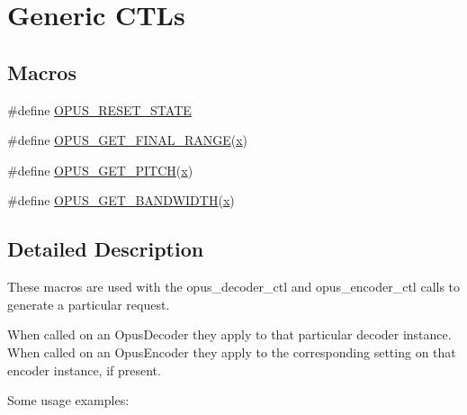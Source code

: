 \hypertarget{group__opus__genericctls}{}\section{Generic C\+T\+Ls}
\label{group__opus__genericctls}
\subsection*{Macros}
\begin{DoxyCompactItemize}
\item 
\#define \mbox{\hyperlink{group__opus__genericctls_gadc74e4fa8bcdf9994187d52d92207337}{O\+P\+U\+S\+\_\+\+R\+E\+S\+E\+T\+\_\+\+S\+T\+A\+TE}}
\item 
\#define \mbox{\hyperlink{group__opus__genericctls_ga1108a508aa475f964d247c1b04d26d89}{O\+P\+U\+S\+\_\+\+G\+E\+T\+\_\+\+F\+I\+N\+A\+L\+\_\+\+R\+A\+N\+GE}}(\mbox{\hyperlink{_s_d_l__opengl_8h_ad0e63d0edcdbd3d79554076bf309fd47}{x}})
\item 
\#define \mbox{\hyperlink{group__opus__genericctls_gaa89fc25eb35fc31a02b508562dd83820}{O\+P\+U\+S\+\_\+\+G\+E\+T\+\_\+\+P\+I\+T\+CH}}(\mbox{\hyperlink{_s_d_l__opengl_8h_ad0e63d0edcdbd3d79554076bf309fd47}{x}})
\item 
\#define \mbox{\hyperlink{group__opus__genericctls_ga29db1d9b5e670debec54d1163ad2ec62}{O\+P\+U\+S\+\_\+\+G\+E\+T\+\_\+\+B\+A\+N\+D\+W\+I\+D\+TH}}(\mbox{\hyperlink{_s_d_l__opengl_8h_ad0e63d0edcdbd3d79554076bf309fd47}{x}})
\end{DoxyCompactItemize}


\subsection{Detailed Description}
These macros are used with the {\ttfamily opus\+\_\+decoder\+\_\+ctl} and {\ttfamily opus\+\_\+encoder\+\_\+ctl} calls to generate a particular request.

When called on an {\ttfamily Opus\+Decoder} they apply to that particular decoder instance. When called on an {\ttfamily Opus\+Encoder} they apply to the corresponding setting on that encoder instance, if present.

Some usage examples\+:


